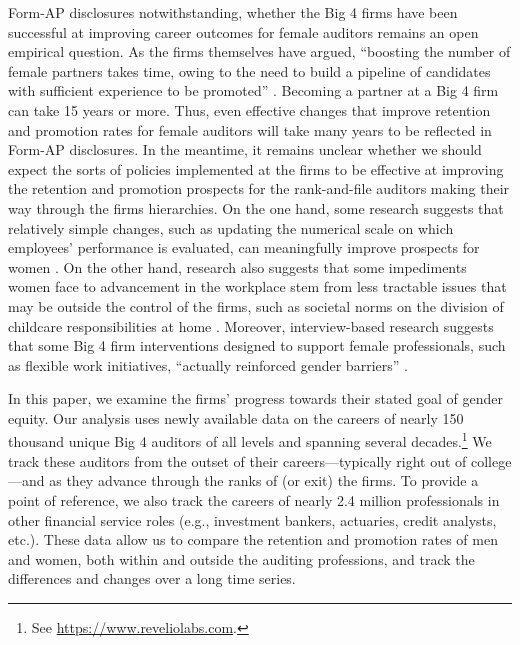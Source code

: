 \documentclass[11pt]{article}
\begin{document}
    Form-AP disclosures notwithstanding, whether the Big 4 firms have been successful at improving career outcomes for female auditors remains an open empirical question. As the firms themselves have argued, ``boosting the number of female partners takes time, owing to the need to build a pipeline of candidates with sufficient experience to be promoted'' \parencite{kissinBigFourAccounting2025}. Becoming a partner at a Big 4 firm can take 15 years or more. Thus, even effective changes that improve retention and promotion rates for female auditors will take many years to be reflected in Form-AP disclosures. In the meantime, it remains unclear whether we should expect the sorts of policies implemented at the firms to be effective at improving the retention and promotion prospects for the rank-and-file auditors making their way through the firms hierarchies. On the one hand, some research suggests that relatively simple changes, such as updating the numerical scale on which employees' performance is evaluated, can meaningfully improve prospects for women \parencite{riveraScalingInequalityRating2019}. On the other hand, research also suggests that some impediments women face to advancement in the workplace stem from less tractable issues that may be outside the control of the firms, such as societal norms on the division of childcare responsibilities at home \parencite{duLockedinHomeGender2023}. Moreover, interview-based research suggests that some Big 4 firm interventions designed to support female professionals, such as flexible work initiatives, ``actually reinforced gender barriers'' \parencite{kornbergerChangingGenderDomination2010}.
    
    In this paper, we examine the firms' progress towards their stated goal of gender equity. Our analysis uses newly available data on the careers of nearly 150 thousand unique Big 4 auditors of all levels and spanning several decades.\footnote{See \url{https://www.reveliolabs.com}.} We track these auditors from the outset of their careers—typically right out of college—and as they advance through the ranks of (or exit) the firms. To provide a point of reference, we also track the careers of nearly 2.4 million professionals in other financial service roles (e.g., investment bankers, actuaries, credit analysts, etc.). These data allow us to compare the retention and promotion rates of men and women, both within and outside the auditing professions, and track the differences and changes over a long time series.
           
\end{document}
